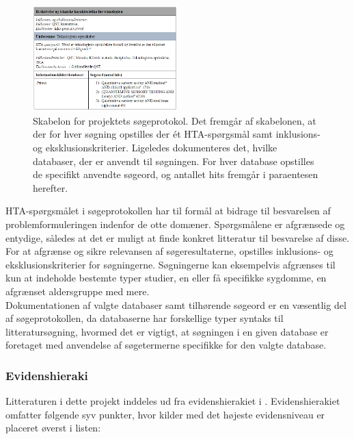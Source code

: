 \begin{figure}[H]
\begin{center}
\includegraphics[width=0.5\textwidth]{figures/cMetode/soegeprotokol}
\end{center}
\caption{Skabelon for projektets søgeprotokol. Det fremgår af skabelonen, at der for hver søgning opstilles der ét HTA-spørgsmål samt inklusions- og eksklusionskriterier. Ligeledes dokumenteres det, hvilke databaser, der er anvendt til søgningen. For hver database opstilles de specifikt anvendte søgeord, og antallet hits fremgår i paraentesen herefter.}
\label{fig:soegeprotokol} 
\end{figure}

HTA-spørgsmålet i søgeprotokollen har til formål at bidrage til besvarelsen af problemformuleringen indenfor de otte domæner. Spørgsmålene er afgrænsede og entydige, således at det er muligt at finde konkret litteratur til besvarelse af disse. \citep{metodehaandbogen}  \\
For at afgrænse og sikre relevansen af søgeresultaterne, opstilles inklusions- og eksklusionskriterier for søgningerne. Søgningerne kan eksempelvis afgrænses til kun at indeholde bestemte typer studier, en eller få specifikke sygdomme, en afgrænset aldersgruppe med mere. \citep{metodehaandbogen} \\
Dokumentationen af valgte databaser samt tilhørende søgeord er en væsentlig del af søgeprotokollen, da databaserne har forskellige typer syntaks til litteratursøgning, hvormed det er vigtigt, at søgningen i en given database er foretaget med anvendelse af søgetermerne specifikke for den valgte database. \citep{metodehaandbogen}

\subsubsection{Evidenshieraki}
Litteraturen i dette projekt inddeles ud fra evidenshierakiet i . Evidenshierakiet omfatter følgende syv punkter, hvor kilder med det højeste evidensniveau er placeret øverst i listen:

